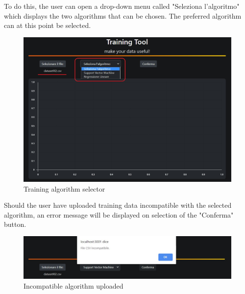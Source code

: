 To do this, the user can open a drop-down menu called "Seleziona l'algoritmo" which displays the two algorithms that can be chosen. The preferred algorithm can at this point be selected.
\begin{figure}[H]
\centering
\includegraphics[scale=0.65]{img/tool/algo_selector.jpg}
\caption{Training algorithm selector}
\end{figure}
Should the user have uploaded training data incompatible with the selected algorithm, an error message will be displayed on selection of the "Conferma" button.\newline
\begin{figure}[H]
\centering
\includegraphics[scale=0.65]{img/tool/err_msg_algo.jpg}
\caption{Incompatible algorithm uploaded}
\end{figure}
\newpage
